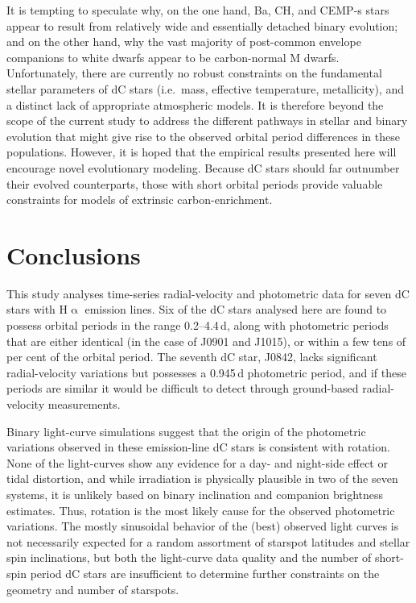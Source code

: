 \documentclass[fleqn,usenatbib,useAMS]{mnras}
\begin{document}
It is tempting to speculate why, on the one hand, Ba, CH, and CEMP-s stars appear to result from relatively wide and essentially detached binary evolution; and on the other hand, why the vast majority of post-common envelope companions to white dwarfs appear to be carbon-normal M dwarfs.  Unfortunately, there are currently no robust constraints on the fundamental stellar parameters of dC stars (i.e.\ mass, effective temperature, metallicity), and a distinct lack of appropriate atmospheric models.  It is therefore beyond the scope of the current study to address the different pathways in stellar and binary evolution that might give rise to the observed orbital period differences in these populations.  However, it is hoped that the empirical results presented here will encourage novel evolutionary modeling.  Because dC stars should far outnumber their evolved counterparts, those with short orbital periods provide valuable constraints for models of extrinsic carbon-enrichment.



\section{Conclusions}

This study analyses time-series radial-velocity and photometric data for seven dC stars with H$\upalpha$ emission lines.  Six of the dC stars analysed here are found to possess orbital periods in the range 0.2--4.4\,d, along with photometric periods that are either identical (in the case of J0901 and J1015), or within a few tens of per cent of the orbital period.  The seventh dC star, J0842, lacks significant radial-velocity variations but possesses a 0.945\,d photometric period, and if these periods are similar it would be difficult to detect through ground-based radial-velocity measurements.  

Binary light-curve simulations suggest that the origin of the photometric variations observed in these emission-line dC stars is consistent with rotation.  None of the light-curves show any evidence for a day- and night-side effect or tidal distortion, and while irradiation is physically plausible in two of the seven systems, it is unlikely based on binary inclination and companion brightness estimates.  Thus, rotation is the most likely cause for the observed photometric variations.  The mostly sinusoidal behavior of the (best) observed light curves is not necessarily expected for a random assortment of starspot latitudes and stellar spin inclinations, but both the light-curve data quality and the number of short-spin period dC stars are insufficient to determine further constraints on the geometry and number of starspots.
\end{document}
